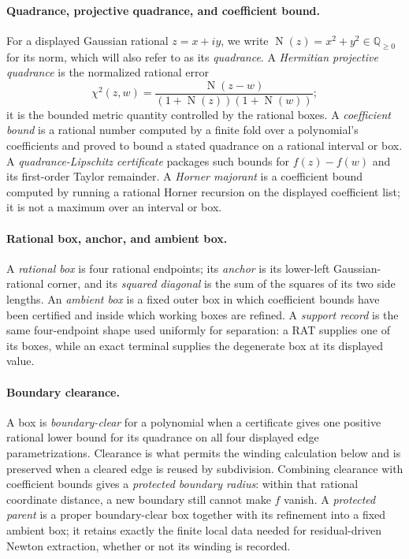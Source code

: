 \documentclass[11pt]{article}
\newcommand{\Q}{\mathbb{Q}}
\newcommand{\Norm}[1]{\operatorname{N}\!\left(#1\right)}
\begin{document}
\paragraph{Quadrance, projective quadrance, and coefficient bound.}
For a displayed Gaussian rational $z=x+iy$, we write
$\Norm z=x^2+y^2\in\Q_{\ge0}$ for its norm, which will also refer to as its \emph{quadrance}. A
\emph{Hermitian projective quadrance} is the normalized rational error
\[
             \chi^2(z,w)=
             \frac{\Norm{z-w}}{(1+\Norm z)(1+\Norm w)};
\]
it is the bounded metric quantity controlled by the rational boxes.  A
\emph{coefficient bound} is a rational number computed by a finite fold over
a polynomial's coefficients and proved to bound a stated quadrance on a
rational interval or box.  A \emph{quadrance-Lipschitz certificate} packages
such bounds for $f(z)-f(w)$ and its first-order Taylor remainder.  A
\emph{Horner majorant} is a coefficient bound computed by running a rational
Horner recursion on the displayed coefficient list; it is not a maximum over
an interval or box.

\paragraph{Rational box, anchor, and ambient box.}
A \emph{rational box} is four rational endpoints; its \emph{anchor} is its
lower-left Gaussian-rational corner, and its \emph{squared diagonal} is the
sum of the squares of its two side lengths.  An \emph{ambient box} is a fixed
outer box in which coefficient bounds have been certified and inside which
working boxes are refined.  A \emph{support record} is the same four-endpoint
shape used uniformly for separation: a RAT supplies one of its boxes, while
an exact terminal supplies the degenerate box at its displayed value.

\paragraph{Boundary clearance.}
A box is \emph{boundary-clear} for a polynomial when a certificate gives one
positive rational lower bound for its quadrance on all four displayed edge
parametrizations.  Clearance is what permits the winding calculation below
and is preserved when a cleared edge is reused by subdivision.  Combining
clearance with coefficient bounds gives a \emph{protected boundary radius}:
within that rational coordinate distance, a new boundary still cannot make
$f$ vanish.  A \emph{protected parent} is a proper boundary-clear box together
with its refinement into a fixed ambient box; it retains exactly the finite
local data needed for residual-driven Newton extraction, whether or not its
winding is recorded.
\end{document}

